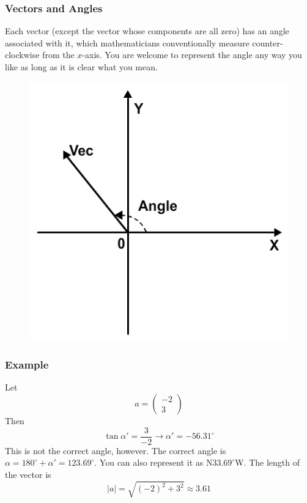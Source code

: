 \documentclass[xcolor=dvipsnames]{beamer}
\begin{document}
\begin{frame}
  \frametitle{Vectors and Angles}
Each vector (except the vector whose components are all zero) has an
angle associated with it, which mathematicians conventionally measure
counter-clockwise from the $x$-axis. You are welcome to represent the
angle any way you like as long as it is clear what you mean.
  \begin{figure}[h]
    \includegraphics[scale=.5]{./AngleCartesian.png}
  \end{figure}
\end{frame}

\begin{frame}
  \frametitle{Example}
Let
\begin{equation}
  \label{eq:cieteang}
  a=\left(
    \begin{array}{c}
      -2 \\
      3
    \end{array}\right)
\end{equation}
Then
\begin{equation}
  \label{eq:rujiwath}
  \tan\alpha'=\frac{3}{-2}\longrightarrow\alpha'=-56.31^{\circ}
\end{equation}
This is not the correct angle, however. The correct angle is
$\alpha=180^{\circ}+\alpha'=123.69^{\circ}$. You can also represent it
as N$33.69^{\circ}$W. The length of the vector is
\begin{equation}
  \label{eq:kootahpa}
  |a|=\sqrt{(-2)^{2}+3^{2}}\approx{}3.61
\end{equation}
\end{frame}
\end{document}
